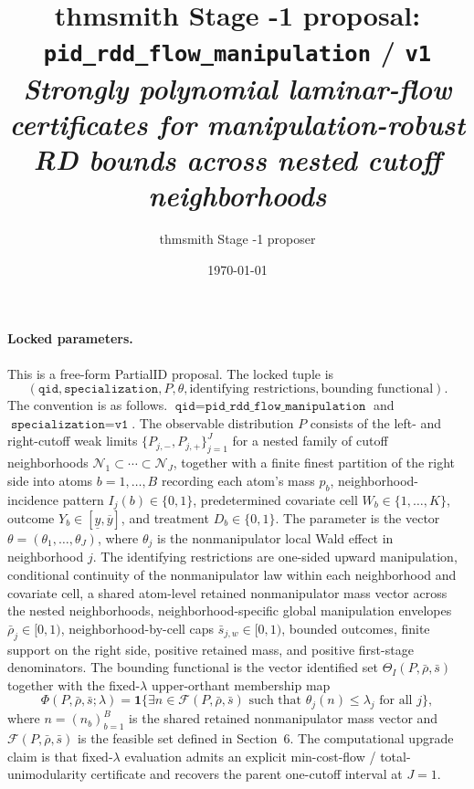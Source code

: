 \documentclass[11pt]{article}
\title{thmsmith Stage -1 proposal: \texttt{pid\_rdd\_flow\_manipulation} / \texttt{v1}%
  \\ \large\textit{Strongly polynomial laminar-flow certificates for manipulation-robust RD bounds across nested cutoff neighborhoods}}
\author{thmsmith Stage -1 proposer}
\date{\today}
\newcommand{\one}{\mathbf{1}}
\theoremstyle{definition}
\theoremstyle{plain}
\theoremstyle{remark}
\begin{document}
\maketitle


\paragraph{Locked parameters.}
This is a free-form PartialID proposal. The locked tuple is
\[
  (\texttt{qid}, \texttt{specialization}, P, \theta, \text{identifying restrictions},
  \text{bounding functional}).
\]
The convention is as follows. \(\texttt{qid}=\texttt{pid\_rdd\_flow\_manipulation}\) and
\(\texttt{specialization}=\texttt{v1}\). The observable distribution \(P\) consists of
the left- and right-cutoff weak limits \(\{P_{j,-},P_{j,+}\}_{j=1}^J\) for a nested family
of cutoff neighborhoods \(\mathcal N_1\subset\cdots\subset\mathcal N_J\), together with a
finite finest partition of the right side into atoms \(b=1,\ldots,B\) recording each atom's
mass \(p_b\), neighborhood-incidence pattern \(I_j(b)\in\{0,1\}\), predetermined covariate
cell \(W_b\in\{1,\ldots,K\}\), outcome \(Y_b\in[\underline y,\overline y]\), and treatment
\(D_b\in\{0,1\}\). The parameter is the vector
\(\theta=(\theta_1,\ldots,\theta_J)\), where \(\theta_j\) is the nonmanipulator local Wald
effect in neighborhood \(j\). The identifying restrictions are one-sided upward manipulation,
conditional continuity of the nonmanipulator law within each neighborhood and covariate cell,
a shared atom-level retained nonmanipulator mass vector across the nested neighborhoods,
neighborhood-specific global manipulation envelopes \(\bar\rho_j\in[0,1)\), neighborhood-by-cell
caps \(\bar s_{j,w}\in[0,1)\), bounded outcomes, finite support on the right side, positive
retained mass, and positive first-stage denominators. The bounding functional is the vector
identified set \(\Theta_I(P,\bar\rho,\bar s)\) together with the fixed-\(\lambda\) upper-orthant
membership map
\[
  \Phi(P,\bar\rho,\bar s;\lambda)
  =\one\{\exists n\in\mathcal F(P,\bar\rho,\bar s)\text{ such that }\theta_j(n)\le \lambda_j
  \text{ for all }j\},
\]
where \(n=(n_b)_{b=1}^B\) is the shared retained nonmanipulator mass vector and
\(\mathcal F(P,\bar\rho,\bar s)\) is the feasible set defined in Section~6. The computational
upgrade claim is that fixed-\(\lambda\) evaluation admits an explicit min-cost-flow /
total-unimodularity certificate and recovers the parent one-cutoff interval at \(J=1\).
\end{document}
